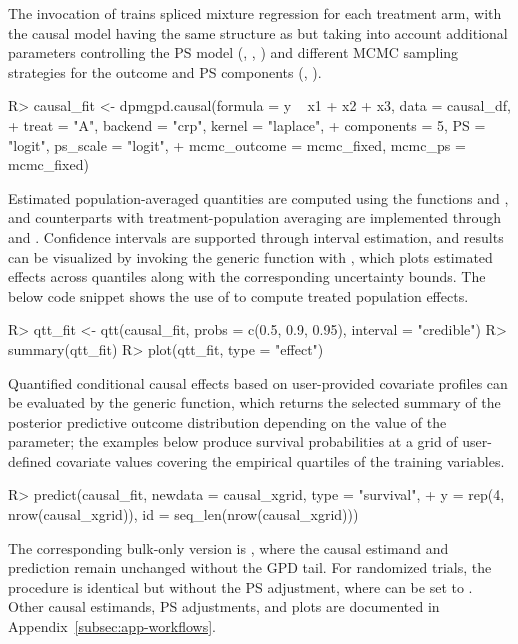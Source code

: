 \documentclass[article]{jss}\usepackage[]{graphicx}\usepackage[]{xcolor}
\renewenvironment{Schunk}{\vspace{0pt}}{\vspace{-0.1\baselineskip}}
\begin{document}
The invocation of  trains spliced mixture
regression for each treatment arm, with the causal model having the
same structure as  but taking into account additional
parameters controlling the PS model (, ,
) and different MCMC sampling strategies for the
outcome and PS components (, ).

\begin{Schunk}
\begin{Sinput}
R> causal_fit <- dpmgpd.causal(formula = y ~ x1 + x2 + x3, data = causal_df,
+                treat = "A",  backend = "crp", kernel = "laplace",
+                components = 5, PS = "logit", ps_scale = "logit",
+                mcmc_outcome = mcmc_fixed, mcmc_ps = mcmc_fixed)
\end{Sinput}
\end{Schunk}

Estimated population-averaged quantities are computed using the
functions  and , and counterparts with
treatment-population averaging are implemented through 
and . Confidence intervals are supported through
interval estimation, and results can be visualized by invoking the
generic  function with , which
plots estimated effects across quantiles along with the corresponding
uncertainty bounds. The below code snippet shows the use of
 to compute treated population effects.

\begin{Schunk}
\begin{Sinput}
R> qtt_fit <- qtt(causal_fit, probs = c(0.5, 0.9, 0.95), interval = "credible")
R> summary(qtt_fit)
R> plot(qtt_fit, type = "effect")
\end{Sinput}
\end{Schunk}

Quantified conditional causal effects based on user-provided
covariate profiles can be evaluated by the generic
 function, which returns the selected summary of the
posterior predictive outcome distribution depending on the value of the 
parameter; the examples below produce survival probabilities at a
grid of user-defined covariate values covering the empirical quartiles
of the training variables.



\begin{Schunk}
\begin{Sinput}
R> predict(causal_fit, newdata = causal_xgrid,  type = "survival",
+          y = rep(4, nrow(causal_xgrid)), id = seq_len(nrow(causal_xgrid)))
\end{Sinput}
\end{Schunk}
The corresponding bulk-only version is ,
where the causal estimand and prediction remain unchanged without
the GPD tail. For randomized trials, the procedure is identical but
without the PS adjustment, where  can be set to .
Other causal estimands, PS adjustments, and plots are documented in
Appendix~\ref{subsec:app-workflows}.
\end{document}
